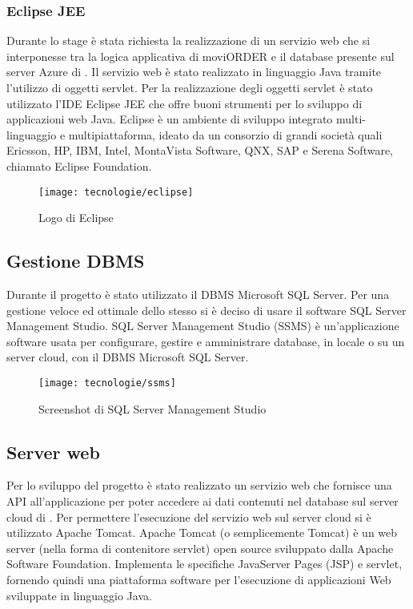 \subsubsection{Eclipse JEE}

Durante lo stage è stata richiesta la realizzazione di un servizio web che si interponesse tra la logica applicativa di moviORDER e il database presente sul server Azure di \visione{}. Il servizio web è stato realizzato in linguaggio Java tramite l'utilizzo di oggetti servlet. Per la realizzazione degli oggetti servlet è stato utilizzato l'IDE Eclipse JEE che offre buoni strumenti per lo sviluppo di applicazioni web Java. Eclipse è un ambiente di sviluppo integrato multi-linguaggio e multipiattaforma, ideato da un consorzio di grandi società quali Ericsson, HP, IBM, Intel, MontaVista Software, QNX, SAP e Serena Software, chiamato Eclipse Foundation.

\begin{figure}[!h] 
    \centering 
    \texttt{[image: tecnologie/eclipse]} 
    \caption{Logo di Eclipse}
\end{figure}

\subsection{Gestione DBMS}

Durante il progetto è stato utilizzato il DBMS Microsoft SQL Server. Per una gestione veloce ed ottimale dello stesso si è deciso di usare il software SQL Server Management Studio. SQL Server Management Studio (SSMS) è un'applicazione software usata per configurare, gestire e amministrare database, in locale o su un server cloud, con il DBMS Microsoft SQL Server. 

\begin{figure}[!h] 
    \centering 
    \texttt{[image: tecnologie/ssms]} 
    \caption{Screenshot di SQL Server Management Studio}
\end{figure}

\subsection{Server web}

Per lo sviluppo del progetto è stato realizzato un servizio web che fornisce una API all'applicazione per poter accedere ai dati contenuti nel database sul server cloud di \visione{}. Per permettere l'esecuzione del servizio web sul server cloud si è utilizzato Apache Tomcat. Apache Tomcat (o semplicemente Tomcat) è un web server (nella forma di contenitore servlet) open source sviluppato dalla Apache Software Foundation. Implementa le specifiche JavaServer Pages (JSP) e servlet, fornendo quindi una piattaforma software per l'esecuzione di applicazioni Web sviluppate in linguaggio Java.

